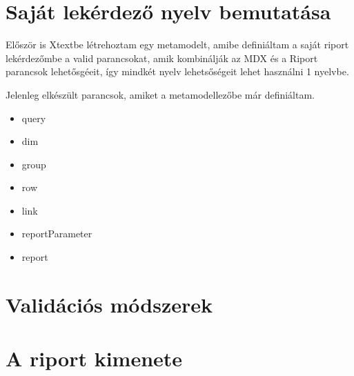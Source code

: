 \section{Saját lekérdező nyelv bemutatása}

Először is Xtextbe létrehoztam egy metamodelt, amibe definiáltam a saját riport
lekérdezőmbe a valid parancsokat, amik kombinálják az MDX és a Riport parancsok
lehetősgéeit, így mindkét nyelv lehetsőségeit lehet használni 1 nyelvbe.

Jelenleg elkészült parancsok, amiket a metamodellezőbe már definiáltam.
\begin{itemize}
  \item  query
  \item dim
  \item group
  \item row
  \item link
  \item reportParameter
  \item report
\end{itemize}


\section{Validációs módszerek}

\section{A riport kimenete}






